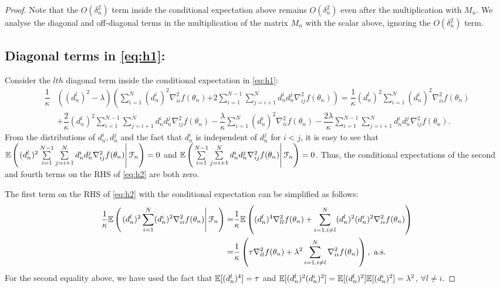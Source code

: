 \begin{proof}
Note that the $O(\delta_n^2)$ term inside the conditional expectation above remains $O(\delta_n^2)$ even after the multiplication with $M_n$.
We analyse the diagonal and off-diagonal terms in the multiplication of the matrix $M_n$ with the scalar above, ignoring the $O(\delta_n^2)$ term. 

\subsection*{Diagonal terms in \eqref{eq:h1}:}

Consider the $lth$ diagonal term inside the conditional expectation in \eqref{eq:h1}:
\begin{align}
\dfrac{1}{\kappa} & \left((d_n^l)^2-\lambda\right) \left(\sum\limits_{i=1}^N (d_n^i)^2 \nabla^2_{ii} f(\theta_n)\right. \left. + 2\sum\limits_{i=1}^{N-1}\sum\limits_{j=i+1}^N d_n^i d_n^j \nabla^2_{ij} f(\theta_n)\right)
=\dfrac{1}{\kappa} (d_n^l)^2 \sum\limits_{i=1}^N (d_n^i)^2 \nabla^2_{ii} f(\theta_n) \nonumber\\
& + \dfrac{2}{\kappa} (d_n^l)^2\sum\limits_{i=1}^{N-1}\sum\limits_{j=i+1}^N d_n^i d_n^j \nabla^2_{ij} f(\theta_n) - \dfrac{ \lambda}{\kappa} \sum\limits_{i=1}^N (d_n^i)^2 \nabla^2_{ii} f(\theta_n) - \dfrac{2 \lambda}{ \kappa} \sum\limits_{i=1}^{N-1}\sum\limits_{j=i+1}^N d_n^i d_n^j \nabla^2_{ij} f(\theta_n).\label{eq:h2}
\end{align}
From the distributions of $d_n^i,d_n^j$ and the fact that $d_n^i$ is independent of $d_n^j$ for $i<j$, it is easy to see that $\mathbb{E}\left(\left. (d_n^l)^2\sum\limits_{i=1}^{N-1}\sum\limits_{j=i+1}^N d_n^i d_n^j \nabla^2_{ij} f(\theta_n) \right| \mathcal{F}_n\right) = 0$ and $\mathbb{E}\left(\left.\sum\limits_{i=1}^{N-1}\sum\limits_{j=i+1}^N d_n^i d_n^j \nabla^2_{ij} f(\theta_n) \right| \mathcal{F}_n\right) = 0$. Thus, the conditional expectations of the second and fourth terms on the RHS of \eqref{eq:h2} are both zero. 

The first term on the RHS of \eqref{eq:h2} with the conditional expectation can be simplified as follows:
\begin{align}\label{eq:term1lem1}
\dfrac{1}{\kappa} \mathbb{E}\left(\left. (d_n^l)^2 \sum\limits_{i=1}^N (d_n^i)^2 \nabla^2_{ii} f(\theta_n) \right| \mathcal{F}_n\right)
= & \dfrac{1}{\kappa} \mathbb{E}\left((d_n^l)^4 \nabla^2_{ll} f(\theta_n) + \sum\limits_{i=1,i\ne l}^N (d_n^l)^2(d_n^i)^2 \nabla^2_{ii} f(\theta_n) \right)\nonumber\\
= & \dfrac{1}{\kappa} \left( \tau \nabla^2_{ll} f(\theta_n) + \lambda^2 \sum\limits_{i=1,i\ne l}^N  \nabla^2_{ii} f(\theta_n) \right), \text{ a.s.}
\end{align} 
For the second equality above, we have used the fact that $\mathbb{E}[(d_n^l)^4] =  \tau$ and $\mathbb{E}[(d_n^l)^2 (d_n^i)^2] = \mathbb{E}[(d_n^l)^2] \mathbb{E}[(d_n^i)^2] = \lambda^2$, $\forall l \ne i$.


\end{proof}
